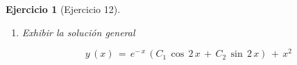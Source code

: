 \documentclass[a4paper,11pt, openany]{book}
\newtheorem{ejer}{Ejercicio}[section]
\newcommand*{\itembolasazules}[1]{%
\footnotesize\protect\tikz[baseline=-3pt]%
\protect\node[scale=.7, circle, shade, ball
color=green]{\color{white}\Large\bf#1};}
\begin{document}
\begin{ejer}[Ejercicio 12]
\begin{enumerate}[label=\itembolasazules{\arabic*}]
$$5\,K_{2}\,x^{2}\,+\,(4\,K_{2}\,+\,5\,K_{1})\,x\,+\,(2\,K_{2}\,+\,2\,K_{1}\,+\,5\,K_{0})\,=\,5\,x^{2}\,+\,4\,x\,+\,2$$
 
$$5\,K_{2}\,=\,5 \quad \textcolor{amber(sae/ece)}{\iff} \quad K_{2}\,=\,\dfrac{5}{5} \quad \textcolor{amber(sae/ece)}{\iff} \quad \boxed{K_{2}\,=\,1}$$
 
$$4\,K_{2}\,+\,5\,K_{1}\,=\,4 \quad \textcolor{amber(sae/ece)}{\iff} \quad 4\,(1)\,+\,5\,K_{1}\,=\,4 \quad \textcolor{amber(sae/ece)}{\iff} \quad 5\,K_{1}\,=\,4\,-\,4 \quad \textcolor{amber(sae/ece)}{\iff} \quad \boxed{K_{1}\,=\,0 }$$
 
$$2\,K_{2}\,+\,2\,K_{1}\,+\,5\,K_{0}\,=\,2 \quad \textcolor{amber(sae/ece)}{\iff} \quad 2\,+\,5\,K_{0}\,=\,2 \quad \textcolor{amber(sae/ece)}{\iff} \quad 5\,K_{0}\,=\,2\,-\,2 \quad \textcolor{amber(sae/ece)}{\iff} \quad \boxed{K_{0}\,=\,0}$$
 
\item Exhibir la solución general 
 
$$\boxed{y\,(x)\,=\,e^{-\,x}\,\left(C_{1}\,\cos\,2\,x\,+\,C_{2}\,\sin\,2\,x \right)\,+\,x^{2}} $$
 
\end{enumerate}

\end{ejer}
 
\end{document}
